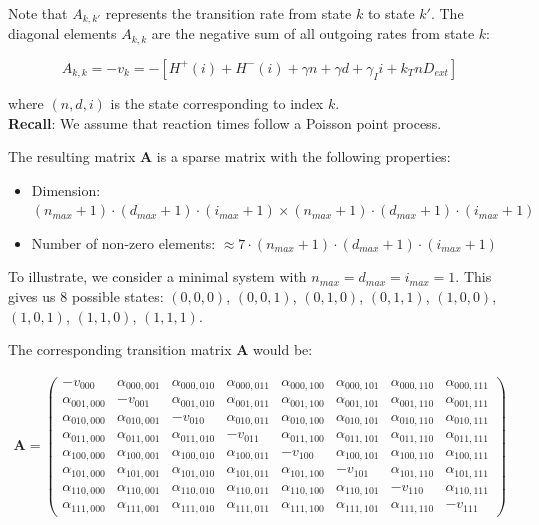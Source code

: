 \documentclass{article}
\begin{document}
\begin{flushleft}
Note that $A_{k,k'}$ represents the transition rate from state $k$ to state $k'$. The diagonal elements $A_{k,k}$ are the negative sum of all outgoing rates from state $k$:

\[
A_{k,k} = -v_k =-[H^+(i) + H^-(i) + \gamma n + \gamma d + \gamma_I i + k_T n D_{ext}]
\]

where $(n,d,i)$ is the state corresponding to index $k$.\\
\textbf{Recall}: We assume that reaction times follow a Poisson point process.

The resulting matrix $\mathbf{A}$ is a sparse matrix with the following properties:
\begin{itemize}
    \item Dimension: $(n_{max}+1) \cdot (d_{max}+1) \cdot (i_{max}+1) \times (n_{max}+1) \cdot (d_{max}+1) \cdot (i_{max}+1)$
    \item Number of non-zero elements: $\approx 7 \cdot (n_{max}+1) \cdot (d_{max}+1) \cdot (i_{max}+1)$
\end{itemize}

To illustrate, we consider a minimal system with $n_{max} = d_{max} = i_{max} = 1$. This gives us 8 possible states:
$(0,0,0)$, $(0,0,1)$, $(0,1,0)$, $(0,1,1)$, $(1,0,0)$, $(1,0,1)$, $(1,1,0)$, $(1,1,1).$

The corresponding transition matrix $\mathbf{A}$ would be:

\small \begin{align*}
\mathbf{A} = 
\begin{pmatrix}
-v_{000} & \alpha_{000,001} & \alpha_{000,010} & \alpha_{000,011} & \alpha_{000,100} & \alpha_{000,101} & \alpha_{000,110} & \alpha_{000,111} \\
\alpha_{001,000} & -v_{001} & \alpha_{001,010} & \alpha_{001,011} & \alpha_{001,100} & \alpha_{001,101} & \alpha_{001,110} & \alpha_{001,111} \\
\alpha_{010,000} & \alpha_{010,001} & -v_{010} & \alpha_{010,011} & \alpha_{010,100} & \alpha_{010,101} & \alpha_{010,110} & \alpha_{010,111} \\
\alpha_{011,000} & \alpha_{011,001} & \alpha_{011,010} & -v_{011} & \alpha_{011,100} & \alpha_{011,101} & \alpha_{011,110} & \alpha_{011,111} \\
\alpha_{100,000} & \alpha_{100,001} & \alpha_{100,010} & \alpha_{100,011} & -v_{100} & \alpha_{100,101} & \alpha_{100,110} & \alpha_{100,111} \\
\alpha_{101,000} & \alpha_{101,001} & \alpha_{101,010} & \alpha_{101,011} & \alpha_{101,100} & -v_{101} & \alpha_{101,110} & \alpha_{101,111} \\
\alpha_{110,000} & \alpha_{110,001} & \alpha_{110,010} & \alpha_{110,011} & \alpha_{110,100} & \alpha_{110,101} & -v_{110} & \alpha_{110,111} \\
\alpha_{111,000} & \alpha_{111,001} & \alpha_{111,010} & \alpha_{111,011} & \alpha_{111,100} & \alpha_{111,101} & \alpha_{111,110} & -v_{111}
\end{pmatrix}
\end{align*}


\end{flushleft}
\end{document}
